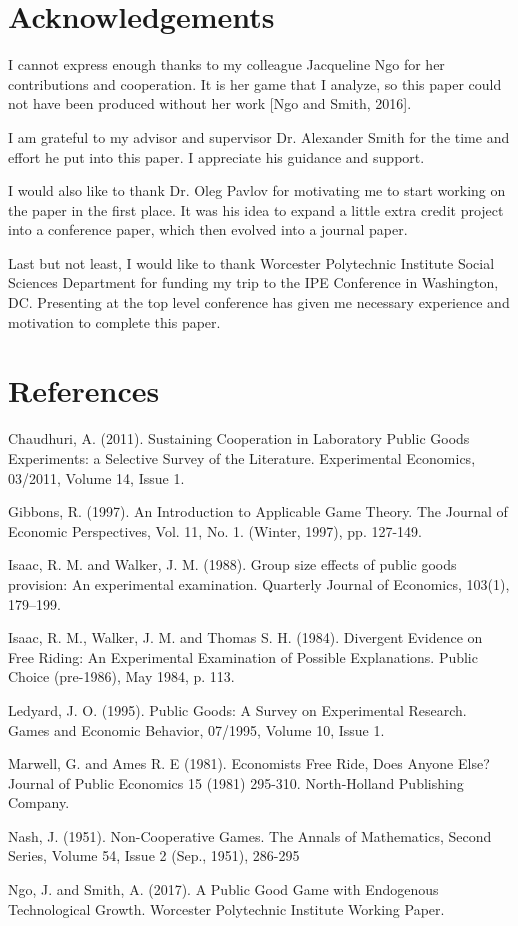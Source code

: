 \section{Acknowledgements}

	I cannot express enough thanks to my colleague Jacqueline Ngo for her contributions and cooperation. It is her game that I analyze, so this paper could not have been produced without her work [Ngo and Smith, 2016].

	I am grateful to my advisor and supervisor Dr. Alexander Smith for the time and effort he put into this paper. I appreciate his guidance and support.

	I would also like to thank Dr. Oleg Pavlov for motivating me to start working on the paper in the first place. It was his idea to expand a little extra credit project into a conference paper, which then evolved into a journal paper.

	Last but not least, I would like to thank Worcester Polytechnic Institute Social Sciences Department for funding my trip to the IPE Conference in Washington, DC. Presenting at the top level conference has given me necessary experience and motivation to complete this paper.

\section{References}

	Chaudhuri, A. (2011). Sustaining Cooperation in Laboratory Public Goods Experiments: a Selective Survey of the Literature. Experimental Economics, 03/2011, Volume 14, Issue 1.
	
	Gibbons, R. (1997). An Introduction to Applicable Game Theory. The Journal of Economic Perspectives, Vol. 11, No. 1. (Winter, 1997), pp. 127-149.

	Isaac, R. M. and Walker, J. M. (1988). Group size effects of public goods provision: An experimental examination. Quarterly Journal of Economics, 103(1), 179–199.

	Isaac, R. M., Walker, J. M. and Thomas S. H. (1984). Divergent Evidence on Free Riding: An Experimental Examination of Possible Explanations. Public Choice (pre-1986), May 1984, p. 113.
	
	Ledyard, J. O. (1995). Public Goods: A Survey on Experimental Research. Games and Economic Behavior, 07/1995, Volume 10, Issue 1. 

	Marwell, G. and Ames R. E (1981). Economists Free Ride, Does Anyone Else? Journal of Public Economics 15 (1981) 295-310. North-Holland Publishing Company.
	
	Nash, J. (1951). Non-Cooperative Games. The Annals of Mathematics, Second Series, Volume 54, Issue 2 (Sep., 1951), 286-295

	Ngo, J. and Smith, A. (2017). A Public Good Game with Endogenous Technological Growth. Worcester Polytechnic Institute Working Paper.
